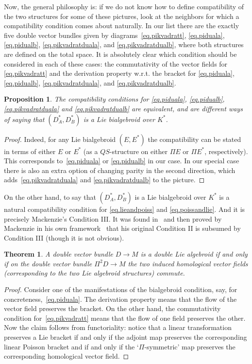 \documentclass[12pt,reqno,a4paper]{amsart}
\newtheorem*{them}{Theorem}
\newtheorem{prop}{Proposition}[section]
\theoremstyle{definition}
\begin{document}
Now, the general philosophy is: if we do not know how to define
compatibility of the two structures for some of these pictures, look
at the neighbors for which a compatibility condition comes about
naturally. In our list there are the exactly five double vector
bundles given by diagrams~\eqref{eq.pikvadratt}, \eqref{eq.piduala},
\eqref{eq.pidualb},  \eqref{eq.pikvadratduala}, and
\eqref{eq.pikvadratdualb}, where both structures are defined on the
total space. It is absolutely clear which condition should be
considered in each of these cases: the commutativity of the vector
fields for \eqref{eq.pikvadratt} and the derivation property w.r.t.
the bracket for \eqref{eq.piduala},  \eqref{eq.pidualb},
\eqref{eq.pikvadratduala}, and \eqref{eq.pikvadratdualb}.

\begin{prop} \label{prop.bialg}
The compatibility conditions for \eqref{eq.piduala},
\eqref{eq.pidualb}, \eqref{eq.pikvadratduala} and
\eqref{eq.pikvadratdualb} are equivalent, and are different ways of
saying that $(D^{*}_{A}, D^{*}_{B})$ is a Lie bialgebroid over
$K^*$.
\end{prop}
\begin{proof} Indeed, for any Lie bialgebroid $(E,E^*)$ the compatibility can
be stated in terms of either $E$ or $E^*$ (as a $QS$-structure on
either $\Pi E$ or $\Pi E^*$, respectively). This corresponds
to~\eqref{eq.piduala} or \eqref{eq.pidualb} in our case. In our
special case  there is also an extra option of changing parity in
the second direction, which adds~\eqref{eq.pikvadratduala} and
\eqref{eq.pikvadratdualb} to the picture.
\end{proof}

On the other hand, to say  that $(D^{*}_{A}, D^{*}_{B})$ is a Lie
bialgebroid over $K^*$ is a natural compatibility condition for
\eqref{eq.lieandpoiss} and \eqref{eq.poissandlie}. And it is
precisely Mackenzie's Condition III. It was found
in~\cite{tv:double} and then proved by Mackenzie in his own
framework~\cite{mackenzie:ehresman} that his original Condition II
is subsumed by Condition III (though it is not obvious).

\begin{them} A double vector bundle $D\to M$ is a double Lie algebroid  if and only if on the double vector bundle $\Pi^2D\to M$ the two induced homological vector fields (corresponding to the two Lie algebroid structures) commute.
\end{them}
\begin{proof} Consider one of the manifestations of the bialgebroid
condition, say, for concreteness,~\eqref{eq.piduala}. The derivation
property means that the flow of the vector field preserves the
bracket. On the other hand, the commutativity condition
for~\eqref{eq.pikvadratt} means that the flow of one field preserves
the other. Now the claim follows from  functoriality: notice that a
linear transformation preserves a Lie bracket if and only if the
adjoint map preserves the corresponding linear Poisson bracket and
if and only if the `$\Pi$-symmetric' map preserves the corresponding
homological vector field.
\end{proof}
\end{document}
